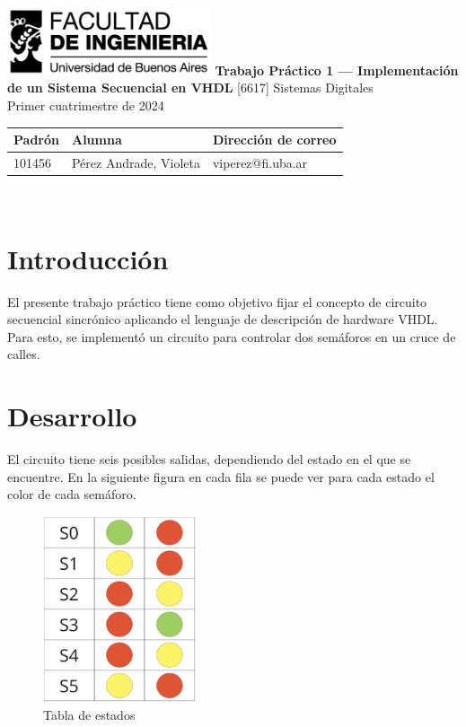\documentclass[titlepage,a4paper]{article}
\begin{document}
\begin{titlepage} %
	\hfill\includegraphics[width=6cm]{logofiuba.jpg}
    \centering
    \vfill
    \Huge \textbf{Trabajo Práctico 1 — Implementación de un Sistema Secuencial en VHDL}
    \vskip2cm
    \Large [6617] Sistemas Digitales \\
    Primer cuatrimestre de 2024
    \vfill
    \begin{tabular}{lll} %
        \toprule
        Padrón & Alumna & Dirección de correo \\
        \midrule
        101456 & Pérez Andrade, Violeta  &  viperez@fi.uba.ar \\
        \bottomrule
    \end{tabular}\\
    \vfill
    \vfill
\end{titlepage}
\tableofcontents %
\newpage

\section{Introducción}\label{sec:intro}
El presente trabajo práctico tiene como objetivo fijar el concepto de circuito secuencial sincrónico aplicando el lenguaje de descripción de hardware VHDL. Para esto, se implementó un circuito para controlar dos semáforos en un cruce de calles.

\section{Desarrollo}\label{sec:desarrollo}
El circuito tiene seis posibles salidas, dependiendo del estado en el que se encuentre. En la siguiente figura en cada fila se puede ver para cada estado el color de cada semáforo.

\begin{figure}[H]
\centering
\includegraphics[width=0.4\textwidth]{figures/tabla_estados.png}
\caption{\label{fig:tabla_estados}Tabla de estados}
\end{figure}
\end{document}
